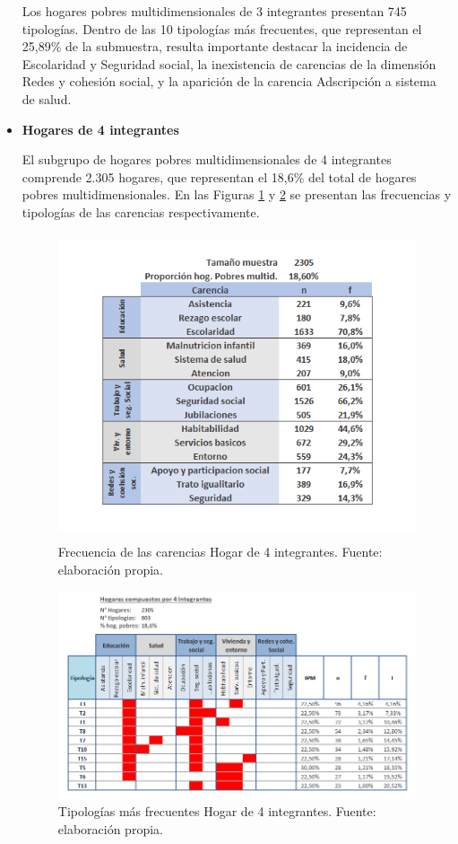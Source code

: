 \documentclass[12pt,letterpaper,spanish]{article}
\begin{document}
\begin{itemize}
    Los hogares pobres multidimensionales de 3 integrantes presentan 745 tipologías. Dentro de las 10 tipologías más frecuentes, que representan el 25,89\% de la submuestra, resulta importante destacar la incidencia de Escolaridad y Seguridad social, la inexistencia de carencias de la dimensión Redes y cohesión social, y la aparición de la carencia Adscripción a sistema de salud.
    
    \item \textbf{Hogares de 4 integrantes}
    
    El subgrupo de hogares pobres multidimensionales de 4 integrantes comprende 2.305 hogares, que representan el 18,6\% del total de hogares pobres multidimensionales. En las Figuras \ref{fren4} y \ref{tipn4} se presentan las frecuencias y tipologías de las carencias respectivamente.
   
    \begin{figure}[H]
        \centering
        \includegraphics[height=9cm]{HOGARES/tabla_num4.png}
        \caption{Frecuencia de las carencias Hogar de 4 integrantes. Fuente: elaboración propia.}
        \label{fren4}
    \end{figure}
    \begin{figure}[H]
        \centering
        \includegraphics[width=\textwidth]{Mati N/n=4.png}
        \caption{Tipologías más frecuentes Hogar de 4 integrantes. Fuente: elaboración propia.}
        \label{tipn4}
    \end{figure}
    

\end{itemize}
\end{document}
